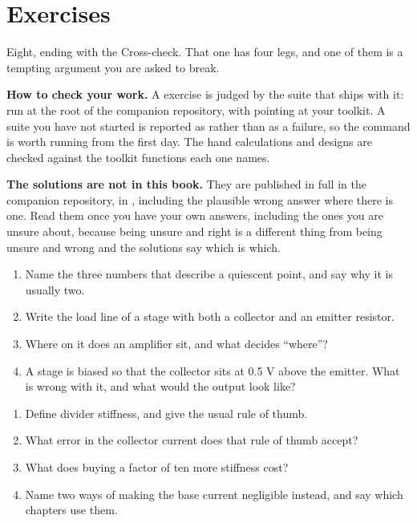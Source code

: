 
\section{Exercises}
\label{c6:sec:exercises}

Eight, ending with the Cross-check. That one has four legs, and one of them is a tempting argument you are asked to break.

\begin{aside}
\textbf{How to check your work.} A  exercise is judged by the suite that ships with it: run  at the root of the companion repository, with  pointing at your toolkit. A suite you have not started is reported as  rather than as a failure, so the command is worth running from the first day. The hand calculations and designs are checked against the toolkit functions each one names.

\textbf{The solutions are not in this book.} They are published in full in the companion repository, in , including the plausible wrong answer where there is one. Read them once you have your own answers, including the ones you are unsure about, because being unsure and right is a different thing from being unsure and wrong and the solutions say which is which.
\end{aside}

\label{c6:ex:1}
\begin{enumerate}
  \item Name the three numbers that describe a quiescent point, and say why it is usually two.
  \item Write the load line of a stage with both a collector and an emitter resistor.
  \item Where on it does an amplifier sit, and what decides ``where''?
  \item A stage is biased so that the collector sits at 0.5 V above the emitter. What is wrong with it, and what would the output look like?
\end{enumerate}

\label{c6:ex:2}
\begin{enumerate}
  \item Define divider stiffness, and give the usual rule of thumb.
  \item What error in the collector current does that rule of thumb accept?
  \item What does buying a factor of ten more stiffness cost?
  \item Name two ways of making the base current negligible instead, and say which chapters use them.
\end{enumerate}


